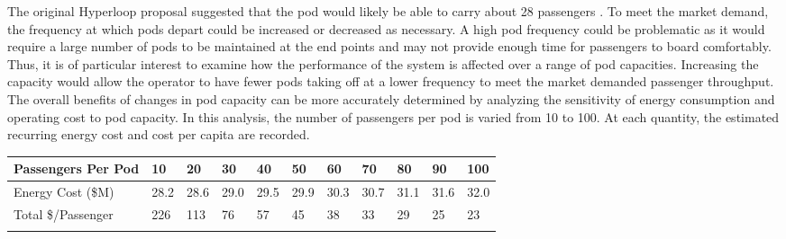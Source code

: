 The original Hyperloop proposal suggested
that the pod would likely be able to carry about 28 passengers \cite{Musk}.
To meet the market demand, the frequency at which pods depart could be
increased or decreased as necessary. A high pod frequency could be
problematic as it would require a large number of pods to be maintained at
the end points and may not provide enough time for passengers to board comfortably.
Thus, it is of particular interest to examine how the performance of the system
is affected over a range of pod capacities. Increasing the capacity would allow
the operator to have fewer pods taking off at a lower frequency to meet
the market demanded passenger throughput. The overall benefits of
changes in pod capacity can be more accurately determined by analyzing the
sensitivity of energy consumption and operating cost to pod capacity.
In this analysis, the number of passengers per pod is varied from 10 to 100.
At each quantity, the estimated recurring energy cost and cost per capita are recorded.
\begin{center}
    \begin{tabular}{| l | l | l | l | l | l | l | l | l | l | l |}
    \hline
    Passengers Per Pod & 10 & 20 & 30 & 40 & 50 & 60 & 70 & 80 & 90 & 100 \\ \hline
    Energy Cost (\$M) & 28.2 & 28.6 & 29.0 & 29.5 & 29.9 & 30.3 & 30.7 & 31.1 & 31.6 & 32.0 \\ \hline
    Total \$/Passenger & 226 & 113 & 76 & 57 & 45 & 38 & 33 & 29 & 25 & 23 \\ \hline
    \label{tab:energy_cost_vs_passengers}
    \end{tabular}
\end{center}

